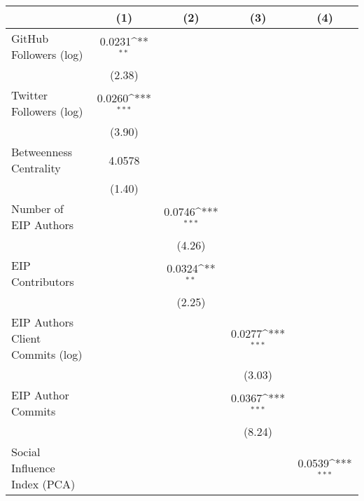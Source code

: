 {
\def\sym#1{\ifmmode^{#1}\else\(^{#1}\)\fi}
\begin{tabular}{l*{4}{c}}
\hline\hline
                                   &\multicolumn{1}{c}{(1)}         &\multicolumn{1}{c}{(2)}         &\multicolumn{1}{c}{(3)}         &\multicolumn{1}{c}{(4)}         \\
\hline
GitHub Followers (log)             &    0.0231\sym{**} &                   &                   &                   \\
                                   &    (2.38)         &                   &                   &                   \\
[1em]
Twitter Followers (log)            &    0.0260\sym{***}&                   &                   &                   \\
                                   &    (3.90)         &                   &                   &                   \\
[1em]
Betweenness Centrality             &    4.0578         &                   &                   &                   \\
                                   &    (1.40)         &                   &                   &                   \\
[1em]
Number of EIP Authors              &                   &    0.0746\sym{***}&                   &                   \\
                                   &                   &    (4.26)         &                   &                   \\
[1em]
EIP Contributors                   &                   &    0.0324\sym{**} &                   &                   \\
                                   &                   &    (2.25)         &                   &                   \\
[1em]
EIP Authors Client Commits (log)   &                   &                   &    0.0277\sym{***}&                   \\
                                   &                   &                   &    (3.03)         &                   \\
[1em]
EIP Author Commits                 &                   &                   &    0.0367\sym{***}&                   \\
                                   &                   &                   &    (8.24)         &                   \\
[1em]
Social Influence Index (PCA)       &                   &                   &                   &    0.0539\sym{***}\\

\end{tabular}}
